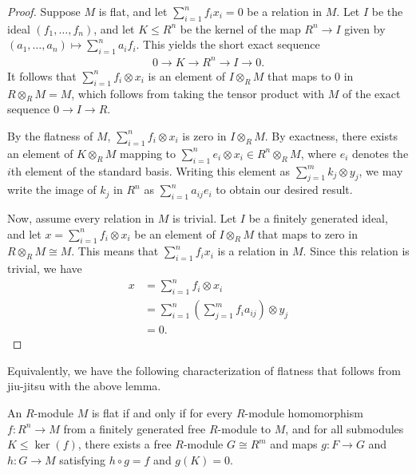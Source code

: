 \documentclass[10pt]{mypackage}
\begin{document}
\begin{proof}
  Suppose $M$ is flat, and let $\sum_{i=1}^{n}f_ix_i = 0$ be a relation in $M$. Let $I$ be the ideal $\left( f_1,\dots,f_n \right)$, and let $K\leq R^n$ be the kernel of the map $R^n\rightarrow I$ given by $\left( a_1,\dots,a_n \right)\mapsto \sum_{i=1}^{n}a_if_i$. This yields the short exact sequence
  \begin{align*}
    0 \rightarrow K\rightarrow R^n\rightarrow I\rightarrow 0.
  \end{align*}
  It follows that $\sum_{i=1}^{n}f_i\otimes x_i$ is an element of $I\otimes_{R}M$ that maps to $0$ in $R\otimes_{R}M = M$, which follows from taking the tensor product with $M$ of the exact sequence $0\rightarrow I\rightarrow R$.

  By the flatness of $M$, $\sum_{i=1}^{n}f_i\otimes x_i$ is zero in $I\otimes_{R}M$. By exactness, there exists an element of $K\otimes_{R}M$ mapping to $\sum_{i=1}^{n}e_i\otimes x_i\in R^n\otimes_{R}M$, where $e_i$ denotes the $i$th element of the standard basis. Writing this element as $\sum_{j=1}^{m}k_j\otimes y_j$, we may write the image of $k_j$ in $R^n$ as $\sum_{i=1}^{n}a_{ij}e_i$ to obtain our desired result.

  Now, assume every relation in $M$ is trivial. Let $I$ be a finitely generated ideal, and let $x = \sum_{i=1}^{n}f_i\otimes x_i$ be an element of $I\otimes_{R}M$ that maps to zero in $R\otimes_{R}M \cong M$. This means that $\sum_{i=1}^{n}f_ix_i$ is a relation in $M$. Since this relation is trivial, we have
  \begin{align*}
    x &= \sum_{i=1}^{n}f_i\otimes x_i\\
      &= \sum_{i=1}^{n}\left( \sum_{j=1}^{m}f_ia_{ij} \right)\otimes y_j\\
      &= 0.
  \end{align*}
\end{proof}
Equivalently, we have the following characterization of flatness that follows from jiu-jitsu with the above lemma.
\begin{theorem}
  An $R$-module $M$ is flat if and only if for every $R$-module homomorphism $f\colon R^{n}\rightarrow M$ from a finitely generated free $R$-module to $M$, and for all submodules $K\leq \ker\left( f \right)$, there exists a free $R$-module $G\cong R^{m}$ and maps $g\colon F\rightarrow G$ and $h\colon G\rightarrow M$ satisfying $h\circ g = f$ and $g(K) = 0$.
  \begin{center}
  \end{center}
\end{theorem}
\end{document}

